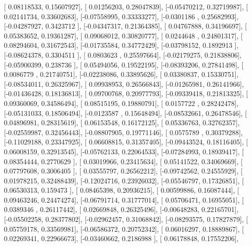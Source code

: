 \documentclass{article}
\begin{document}
       [ 0.08118533,  0.15607927],
       [ 0.01256203,  0.28047839],
       [-0.05470212,  0.32719987],
       [ 0.02141734,  0.33602683],
       [-0.07558995,  0.33333277],
       [-0.0301186 ,  0.25682993],
       [-0.04287927,  0.3423712 ],
       [-0.04347317,  0.21364385],
       [ 0.04767888,  0.34196697],
       [ 0.05383652,  0.19361287],
       [ 0.09068012,  0.30820777],
       [ 0.0244648 ,  0.24801317],
       [ 0.08294604,  0.31672543],
       [-0.01735584,  0.34772429],
       [-0.03798152,  0.1892913 ],
       [-0.08624378,  0.3304511 ],
       [ 0.0803623 ,  0.25597664],
       [-0.02179275,  0.21838806],
       [-0.05900399,  0.238736  ],
       [ 0.05494056,  0.19522195],
       [-0.08393206,  0.27841498],
       [ 0.0086779 ,  0.21740751],
       [-0.02238086,  0.33895626],
       [ 0.03380837,  0.15330751],
       [-0.08534011,  0.26325967],
       [ 0.09938953,  0.26566843],
       [-0.01265981,  0.26141966],
       [-0.01436428,  0.18136813],
       [ 0.09700768,  0.20977793],
       [-0.09339418,  0.21813325],
       [ 0.09360069,  0.34586494],
       [ 0.08515195,  0.19880791],
       [ 0.0157722 ,  0.28242478],
       [-0.05131033,  0.18506494],
       [-0.0123587 ,  0.15648494],
       [-0.08532661,  0.26478546],
       [ 0.04896981,  0.28315619],
       [ 0.06153548,  0.16172125],
       [ 0.05336763,  0.32762357],
       [-0.02559987,  0.32456443],
       [-0.08807905,  0.19771146],
       [ 0.0575789 ,  0.30379288],
       [-0.11029188,  0.23347925],
       [ 0.06608815,  0.31357405],
       [-0.09443524,  0.18116405],
       [ 0.06008159,  0.32913545],
       [-0.05762133,  0.22064533],
       [-0.07284993,  0.18939417],
       [ 0.08354444,  0.2770629 ],
       [ 0.03019966,  0.23415634],
       [ 0.05141522,  0.34069669],
       [ 0.07797608,  0.3006405 ],
       [ 0.03555797,  0.26562212],
       [-0.09742562,  0.24555929],
       [ 0.01978215,  0.32488439],
       [-0.12024716,  0.23926032],
       [-0.05546797,  0.17326851],
       [ 0.06530313,  0.159473  ],
       [ 0.08465398,  0.20936215],
       [ 0.00599886,  0.16087444],
       [ 0.09463246,  0.24474274],
       [-0.06791714,  0.31777014],
       [ 0.05706471,  0.16955051],
       [ 0.0389346 ,  0.26117442],
       [ 0.02669848,  0.26325496],
       [-0.00648283,  0.22165701],
       [-0.05502258,  0.28377802],
       [-0.02962457,  0.31068842],
       [-0.08293575,  0.17827879],
       [ 0.05759178,  0.33569981],
       [-0.06586372,  0.20752342],
       [ 0.06016297,  0.18889867],
       [ 0.02269341,  0.22966673],
       [-0.03460662,  0.2186988 ],
       [ 0.06178848,  0.17552206],
\end{document}
